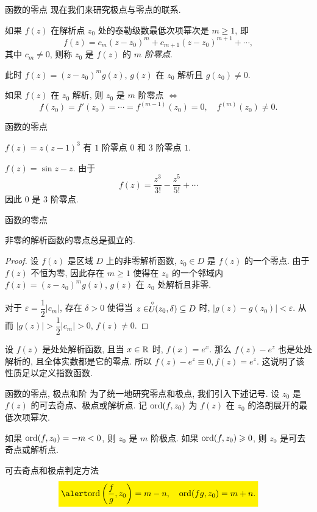 \begin{frame}{函数的零点}
\onslide<+->
现在我们来研究极点与零点的联系.
\begin{definition}
如果 $f(z)$ 在解析点 $z_0$ 处的泰勒级数最低次项幂次是 $m\ge1$, 即
\[f(z)=c_m(z-z_0)^m+c_{m+1}(z-z_0)^{m+1}+\cdots,\]
其中 $c_m\neq 0$, 则称 $z_0$ 是 $f(z)$ 的 \emph{$m$ 阶零点}.
\end{definition}
\onslide<+->
此时 $f(z)=(z-z_0)^mg(z)$, $g(z)$ 在 $z_0$ 解析且 $g(z_0)\neq 0$.

\begin{theorem}
如果 $f(z)$ 在 $z_0$ 解析, 则 $z_0$ 是 $m$ 阶零点 $\iff$
\[f(z_0)=f'(z_0)=\cdots=f^{(m-1)}(z_0)=0,\quad
f^{(m)}(z_0)\neq 0.\]
\end{theorem}
\end{frame}


\begin{frame}{函数的零点}
\begin{example}
$f(z)=z(z-1)^3$
\onslide<+->
有 $1$ 阶零点 $0$ 和 $3$ 阶零点 $1$.
\end{example}
\begin{example}
$f(z)=\sin z-z$.
\onslide<+->
由于
\[f(z)=\frac{z^3}{3!}-\frac{z^5}{5!}+\cdots\]
因此 $0$ 是 $3$ 阶零点.
\end{example}
\end{frame}


\begin{frame}{函数的零点}
\begin{theorem}
非零的解析函数的零点总是孤立的.
\end{theorem}
\begin{proof}
\indent
设 $f(z)$ 是区域 $D$ 上的非零解析函数, $z_0\in D$ 是 $f(z)$ 的一个零点.
\onslide<+->
由于 $f(z)$ 不恒为零, 因此存在 $m\ge 1$ 使得在 $z_0$ 的一个邻域内 $f(z)=(z-z_0)^m g(z)$, $g(z)$ 在 $z_0$ 处解析且非零.

\indent
\onslide<+->
对于 $\varepsilon=\dfrac12|c_m|$, 存在 $\delta>0$ 使得当 $z\in \stackrel{\circ}{U}\!\!(z_0,\delta)\subseteq D$ 时, $|g(z)-g(z_0)|<\varepsilon$.
\onslide<+->
从而 $|g(z)|>\dfrac12|c_m|>0$, $f(z)\neq 0$.
\end{proof}

\onslide<+->
设 $f(z)$ 是处处解析函数, 且当 $x\in{\mathbb{R}}$ 时, $f(x)=e^x$.
\onslide<+->
那么 $f(z)-e^z$ 也是处处解析的, 且全体实数都是它的零点.
\onslide<+->
所以 $f(z)-e^z\equiv0,f(z)=e^z$.
\onslide<+->
这说明了该性质足以定义指数函数.
\end{frame}


\begin{frame}{函数的零点, 极点和阶}
\onslide<+->
为了统一地研究零点和极点, 我们引入下述记号.
\onslide<+->
设 $z_0$ 是 $f(z)$ 的可去奇点、极点或解析点.
\onslide<+->
记 ${\mathrm{ord}}(f,z_0)$ 为 $f(z)$ 在 $z_0$ 的洛朗展开的最低次项幂次.

\onslide<+->
如果 ${\mathrm{ord}}(f,z_0)=-m<0$, 则 $z_0$ 是 $m$ 阶极点.
\onslide<+->
如果 ${\mathrm{ord}}(f,z_0)\geqslant 0$, 则 $z_0$ 是可去奇点或解析点.

\begin{block}{可去奇点和极点判定方法}
\[\aboxeq{\ord\left(\frac fg,z_0\right)=m-n,\quad\ord(fg,z_0)=m+n.}\]
\end{block}
\end{frame}


